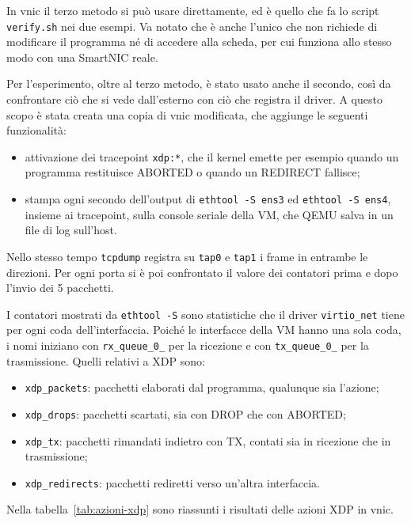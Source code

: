 In vnic il terzo metodo si può usare direttamente, ed è quello che fa lo script \texttt{verify.sh} nei due esempi. Va notato che è anche l'unico che non richiede di modificare il programma né di accedere alla scheda, per cui funziona allo stesso modo con una SmartNIC reale.

Per l'esperimento, oltre al terzo metodo, è stato usato anche il secondo, così da confrontare ciò che si vede dall'esterno con ciò che registra il driver. A questo scopo è stata creata una copia di vnic modificata, che aggiunge le seguenti funzionalità:
\begin{itemize}
    \item attivazione dei tracepoint \texttt{xdp:*}, che il kernel emette per esempio quando un programma restituisce ABORTED o quando un REDIRECT fallisce;
    \item stampa ogni secondo dell'output di \texttt{ethtool -S ens3} ed \texttt{ethtool -S ens4}, insieme ai tracepoint, sulla console seriale della VM, che QEMU salva in un file di log sull'host.
\end{itemize}

Nello stesso tempo \texttt{tcpdump} registra su \texttt{tap0} e \texttt{tap1} i frame in entrambe le direzioni. Per ogni porta si è poi confrontato il valore dei contatori prima e dopo l'invio dei 5 pacchetti.

I contatori mostrati da \texttt{ethtool -S} sono statistiche che il driver \texttt{virtio\_net} tiene per ogni coda dell'interfaccia. Poiché le interfacce della VM hanno una sola coda, i nomi iniziano con \texttt{rx\_queue\_0\_} per la ricezione e con \texttt{tx\_queue\_0\_} per la trasmissione. Quelli relativi a XDP sono:
\begin{itemize}
    \item \texttt{xdp\_packets}: pacchetti elaborati dal programma, qualunque sia l'azione;
    \item \texttt{xdp\_drops}: pacchetti scartati, sia con DROP che con ABORTED;
    \item \texttt{xdp\_tx}: pacchetti rimandati indietro con TX, contati sia in ricezione che in trasmissione;
    \item \texttt{xdp\_redirects}: pacchetti rediretti verso un'altra interfaccia.
\end{itemize}

Nella tabella~\ref{tab:azioni-xdp} sono riassunti i risultati delle azioni XDP in vnic.



